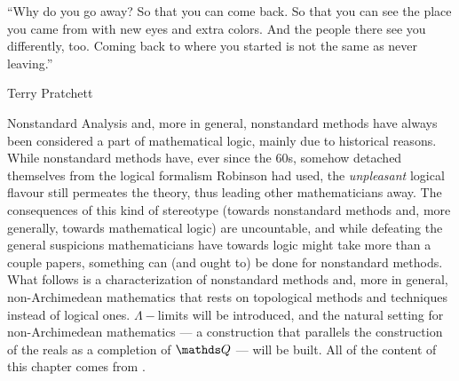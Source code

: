 \documentclass[draft.tex]{subfiles}
\begin{document}
\epigraph{“Why do you go away? So that you can come back. So that you can see the place you came from with new eyes and extra colors. And the people there see you differently, too. Coming back to where you started is not the same as never leaving.”}{Terry Pratchett}
Nonstandard Analysis and, more in general, nonstandard methods have always been considered a part of mathematical logic, mainly due to historical reasons. While nonstandard methods have, ever since the 60s, somehow detached themselves from the logical formalism Robinson had used, the \textit{unpleasant} logical flavour still permeates the theory, thus leading other mathematicians away. The consequences of this kind of stereotype (towards nonstandard methods and, more generally, towards mathematical logic) are uncountable, and while defeating the general suspicions mathematicians have towards logic might take more than a couple papers, something can (and ought to) be done for nonstandard methods. What follows is a characterization of nonstandard methods and, more in general, non-Archimedean mathematics that rests on topological methods and techniques instead of logical ones. $\Lambda-$limits will be introduced, and the natural setting for non-Archimedean mathematics --- a construction that parallels the construction of the reals as a completion of $\QQ$ --- will be built. All of the content of this chapter comes from \cite{NAM}.
\end{document}
